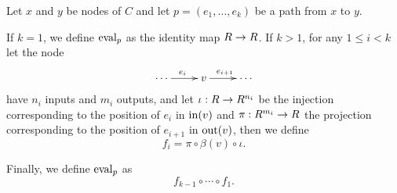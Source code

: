 \begin{definition}
  Let $x$ and $y$ be nodes of $C$ and let $p=(e_1,\ldots,e_k)$ be a
  path from $x$ to $y$.

  If $k=1$, we define $\operatorname{eval}_p$ as the identity map $R\rightarrow R$. If
  $k>1$, for any $1\le i<k$ let the node
  \[\xymatrix{\cdots\ar[r]^{e_i}&v\ar[r]^{e_{i+1}}&\cdots}\]
  have $n_i$ inputs and $m_i$ outputs, and let $\iota:R\rightarrow R^{n_i}$ be
  the injection corresponding to the position of $e_i$ in $\operatorname{in}(v)$
  and $\pi:R^{m_i}\rightarrow R$ the projection corresponding to the position
  of $e_{i+1}$ in $\operatorname{out}(v)$, then we define
  \begin{equation}
    \label{eq:252}
    f_i = \pi\circ\beta(v)\circ\iota
    \text{.}
  \end{equation}

  Finally, we define $\operatorname{eval}_p$ as
  \begin{equation}
    \label{eq:247}
    f_{k-1}\circ\cdots\circ f_1
    \text{.}
  \end{equation}
\end{definition}

